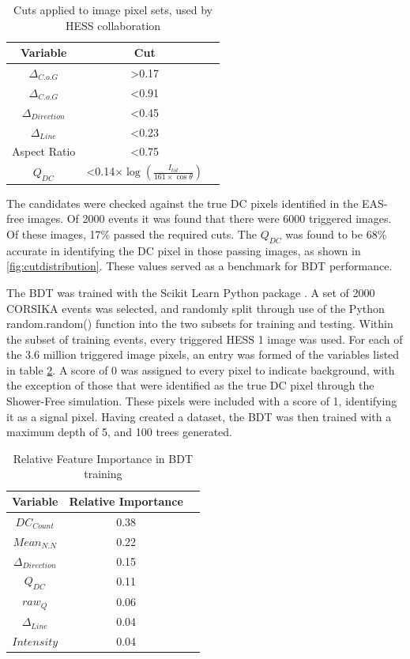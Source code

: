 \documentclass[]{article}
\begin{document}
\begin{table}[h!]
  \centering
  \caption{Cuts applied to image pixel sets, used by HESS collaboration \cite{hess07}}
  \label{tab:table1}
  \begin{tabular}{ccc}
    \toprule
    Variable & Cut\\
    \midrule
     $ \Delta_{C.o.G}$ & \textgreater 0.17 \\
     $ \Delta_{C.o.G}$ & \textless 0.91 \\
     $\Delta_{Direction}$ & \textless 0.45 \\
     $\Delta_{Line}$ & \textless 0.23 \\
     Aspect Ratio & \textless 0.75 \\
     $Q_{DC}$ & \textless 0.14$ \times \log(\frac{I_{tot}}{161 \times \cos \theta})$ \\
    \bottomrule
  \end{tabular}
\end{table}

The candidates were checked against the true DC pixels identified in the EAS-free images. Of 2000 events it was found that there were 6000 triggered images. Of these images, 17\% passed the required cuts. The $Q_{DC}$ was found to be 68\% accurate in identifying the DC pixel in those passing images, as shown in \ref{fig:cutdistribution}. These values served as a benchmark for BDT performance. 

The BDT was trained with the Scikit Learn Python package \cite{scikit-learn}. A set of 2000 CORSIKA events was selected, and randomly split through use of the Python random.random() function into the two subsets for training and testing. Within the subset of training events, every triggered HESS 1 image was used. For each of the 3.6 million triggered image pixels, an entry was formed of the variables listed in table \ref{tab:table2}. A score of 0 was assigned to every pixel to indicate background, with the exception of those that were identified as the true DC pixel through the Shower-Free simulation. These pixels were included with a score of 1, identifying it as a signal pixel. Having created a dataset, the BDT was then trained with a maximum depth of 5, and 100 trees generated.

\begin{table}[h!]
  \centering
  \caption{Relative Feature Importance in BDT training}
  \label{tab:table2}
  \begin{tabular}{ccc}
    \toprule
    Variable & Relative Importance\\
    \midrule
    $DC_{Count}$ & 0.38\\
    $Mean_{N.N}$ & 0.22\\
    $\Delta_{Direction}$ & 0.15\\
    $Q_{DC}$ & 0.11\\
    $raw_{Q}$ & 0.06\\
    $\Delta_{Line}$ & 0.04\\
    $Intensity$ & 0.04\\
    \bottomrule
  \end{tabular}
\end{table}
\end{document}
